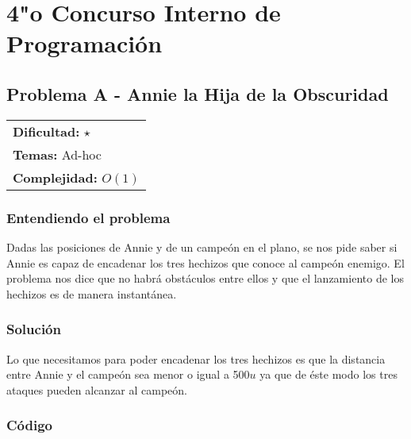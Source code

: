 \chapter{4"o Concurso Interno de Programación}

\section{Problema A - Annie la Hija de la Obscuridad}

\hfill
\begin{tabular}{@{}l@{}}
\textbf{Dificultad:} $\star$ \\
\textbf{Temas:} Ad-hoc \\
\textbf{Complejidad:} $O(1)$
\end{tabular}

\subsection*{Entendiendo el problema}
Dadas las posiciones de Annie y de un campeón en el plano, se nos pide saber si Annie es capaz de encadenar los tres hechizos que conoce al campeón enemigo. El problema nos dice que no habrá obstáculos entre ellos y que el lanzamiento de los hechizos es de manera instantánea.
\subsection*{Solución}
Lo que necesitamos para poder encadenar los tres hechizos es que la distancia entre Annie y el campeón sea menor o igual a 500$u$ ya que de éste modo los tres ataques pueden alcanzar al campeón.
\subsection*{Código}


